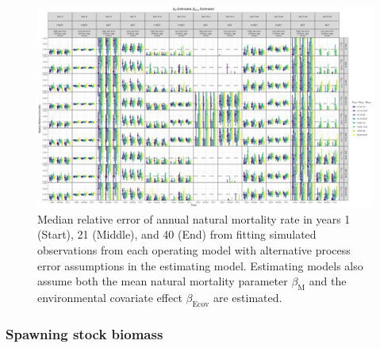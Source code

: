 \documentclass[
  12pt,
]{article}
\begin{document}
\begin{landscape}
\begin{figure}
\caption{Median relative error of annual natural mortality rate in years 1 (Start), 21 (Middle), and 40 (End) from fitting simulated observations from each operating model with alternative process error assumptions in the estimating model. Estimating models also assume both the mean natural mortality parameter $\beta_\text{M}$ and the environmental covariate effect $\beta_\text{Ecov}$ are estimated.}\label{annual_M_bias_M_estimated_beta_estimated}
\begin{center}
\includegraphics[height = \textheight]{annual_M_bias_all_PE_effect_M_estimated_beta_estimated.png}
\end{center}
\end{figure}
\end{landscape}

\hypertarget{spawning-stock-biomass}{%
\subsubsection*{Spawning stock biomass}\label{spawning-stock-biomass}}
\end{document}
